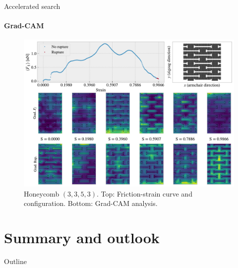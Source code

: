 \documentclass[
	10pt, %
]{beamer}
\begin{document}
%
%
%
%
\begin{frame}{Accelerated search}
	\framesubtitle{Grad-CAM}
	\begin{figure}[H]
		\centering
		\includegraphics[width=0.7\linewidth]{../thesis/figures/search/grad_cam_hon_3_3_5_3_12_0.pdf}
		\caption{Honeycomb $(3,3,5,3)$. Top: Friction-strain curve and configuration. Bottom: Grad-CAM analysis.}
	\end{figure}  
\end{frame}
%
%



\section{Summary and outlook} %
\begin{frame}{Outline}
    \tableofcontents[currentsection]
\end{frame}
\end{document}
